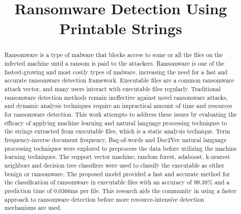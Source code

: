 \documentclass[conference]{IEEEtran}
\begin{document}
\title{Ransomware Detection Using Printable Strings}

\author{

\and
{}

\and
{}
}

\maketitle

\begin{abstract}
Ransomware is a type of malware that blocks access to some or all the files on the infected machine until a ransom is paid to the attackers. Ransomware is one of the fastest-growing and most costly types of malware, increasing the need for a fast and accurate ransomware detection framework. Executable files are a common ransomware attack vector, and many users interact with executable files regularly. Traditional ransomware detection methods remain ineffective against novel ransomware attacks, and dynamic analysis techniques require an impractical amount of time and resources for ransomware detection. This work attempts to address these issues by evaluating the efficacy of applying machine learning and natural language processing techniques to the strings extracted from executable files, which is a static analysis technique. Term frequency-inverse document frequency, Bag-of-words and Doc2Vec natural language processing techniques were explored to preprocess the data before utilizing the machine learning techniques. The support vector machine, random forest, adaboost, k-nearest neighbors and decision tree classifiers were used to classify the executable as either benign or ransomware. The proposed model provided a fast and accurate method for the classification of ransomware in executable files with an accuracy of 99.38\% and a prediction time of 0.0366ms per file. This research aids the community in using a faster approach to ransomware detection before more resource-intensive detection mechanisms are used.\\
\end{abstract}
\end{document}
